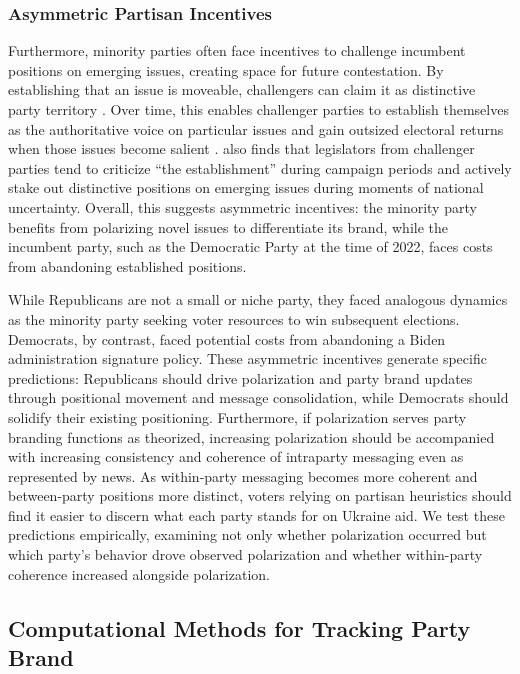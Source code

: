 \subsubsection{Asymmetric Partisan Incentives}

Furthermore, minority parties often face incentives to challenge incumbent positions on emerging issues, creating space for future contestation. By establishing that an issue is moveable, challengers can claim it as distinctive party territory \citep{abou-chadiModerateNecessaryRole2016,adamsCompanyYouKeep2016,meguidPartyCompetitionUnequals2010}. Over time, this enables challenger parties to establish themselves as the authoritative voice on particular issues and gain outsized electoral returns when those issues become salient \citep{abou-chadiModerateNecessaryRole2016}. \citet{kollbergChallengerAdvantageHow2025} also finds that legislators from challenger parties tend to criticize ``the establishment'' during campaign periods and actively stake out distinctive positions on emerging issues during moments of national uncertainty. Overall, this suggests asymmetric incentives: the minority party benefits from polarizing novel issues to differentiate its brand, while the incumbent party, such as the Democratic Party at the time of 2022, faces costs from abandoning established positions.

While Republicans are not a small or niche party, they faced analogous dynamics as the minority party seeking voter resources to win subsequent elections. Democrats, by contrast, faced potential costs from abandoning a Biden administration signature policy. These asymmetric incentives generate specific predictions: Republicans should drive polarization and party brand updates through positional movement and message consolidation, while Democrats should solidify their existing positioning. Furthermore, if polarization serves party branding functions as theorized, increasing polarization should be accompanied with increasing consistency and coherence of intraparty messaging even as represented by news. As within-party messaging becomes more coherent and between-party positions more distinct, voters relying on partisan heuristics should find it easier to discern what each party stands for on Ukraine aid. We test these predictions empirically, examining not only whether polarization occurred but which party's behavior drove observed polarization and whether within-party coherence increased alongside polarization.

\subsection{Computational Methods for Tracking Party Brand}

